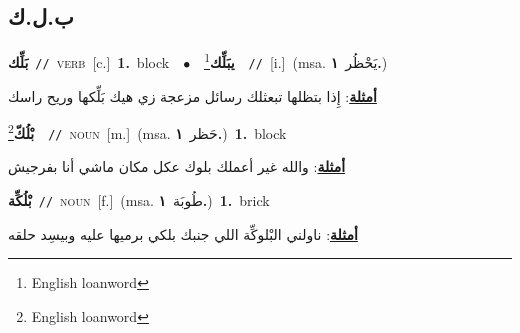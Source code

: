 \documentclass[10pt,a4paper,twoside]{article} %
\begin{document}
\begin{multicols}{2}
\vspace{-3mm}
\subsection*{\color{blue}\foreignlanguage{arabic}{ب.ل.ك}\color{blue}{ (ntws)}} 

{\setlength\topsep{0pt}\textbf{\foreignlanguage{arabic}{بَلِّك}}\ {\color{gray}\texttt{//}\color{black}}\ \textsc{verb}\ [c.]\ \textbf{1.}~block\ \ $\bullet$\ \ \setlength\topsep{0pt}\textbf{\foreignlanguage{arabic}{يبَلِّك}}\footnote{English loanword}\ \ {\color{gray}\texttt{//}\color{black}}\ [i.]\ \color{gray}(msa. \foreignlanguage{arabic}{يَحْظُر}~\foreignlanguage{arabic}{\textbf{١.}})\color{black}\  \begin{flushright}\color{gray}\foreignlanguage{arabic}{\textbf{\underline{\foreignlanguage{arabic}{أمثلة}}}: إِذا بتظلها تبعثلك رسائل مزعجة زي هيك بَلِّكها وريح راسك}\end{flushright}\color{black}} \vspace{2mm}

{\setlength\topsep{0pt}\textbf{\foreignlanguage{arabic}{بْلُكّ}}\footnote{English loanword}\ \ {\color{gray}\texttt{//}\color{black}}\ \textsc{noun}\ [m.]\ \color{gray}(msa. \foreignlanguage{arabic}{حَظر}~\foreignlanguage{arabic}{\textbf{١.}})\color{black}\ \textbf{1.}~block\  \begin{flushright}\color{gray}\foreignlanguage{arabic}{\textbf{\underline{\foreignlanguage{arabic}{أمثلة}}}: والله غير أعملك بلوك عكل مكان ماشي أنا بفرجيش}\end{flushright}\color{black}} \vspace{2mm}

{\setlength\topsep{0pt}\textbf{\foreignlanguage{arabic}{بْلُكِّة}}\ {\color{gray}\texttt{//}\color{black}}\ \textsc{noun}\ [f.]\ \color{gray}(msa. \foreignlanguage{arabic}{طُوبَة}~\foreignlanguage{arabic}{\textbf{١.}})\color{black}\ \textbf{1.}~brick\  \begin{flushright}\color{gray}\foreignlanguage{arabic}{\textbf{\underline{\foreignlanguage{arabic}{أمثلة}}}: ناولني البْلوكِّة اللي جنبك بلكي برميها عليه وبيسِد حلقه}\end{flushright}\color{black}} \vspace{2mm}


\end{multicols}
\end{document}
